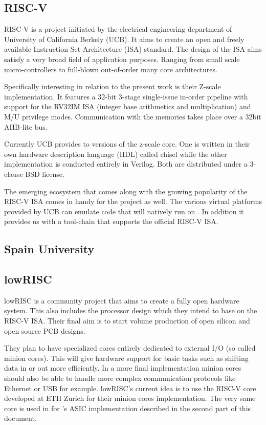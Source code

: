 \subsection{RISC-V}

RISC-V is a project initiated by the electrical engineering department of University of California Berkely (UCB). It aims to create an open and freely available Instruction Set Architecture (ISA) standard. The design of the ISA aims satisfy a very broad field of application purposes. Ranging from small scale micro-controllers to full-blown out-of-order many core architectures.

Specifically interesting in relation to the present work is their Z-scale implementation. It features a 32-bit 3-stage single-issue in-order pipeline with support for the RV32IM ISA (integer base arithmetics and multiplication) and M/U privilege modes. Communication with the memories takes place over a 32bit AHB-lite bus.

Currently UCB provides to versions of the z-scale core. One is written in their own hardware description language (HDL) called chisel while the other implementation is conducted entirely in Verilog. Both are distributed under a 3-clause BSD license.

The emerging ecosystem that comes along with the growing popularity of the RISC-V ISA comes in handy for the \pulpino project as well. The various virtual platforms provided by UCB can emulate code that will natively run on \pulpino. In addition it provides us with a tool-chain that supports the official RISC-V ISA.

\subsection{Spain University}

\subsection{lowRISC}

lowRISC is a community project that aims to create a fully open hardware system. This also includes the processor design which they intend to base on the RISC-V ISA. Their final aim is to start volume production of open silicon and open source PCB designs.

They plan to have specialized cores entirely dedicated to external I/O (so called minion cores). This will give hardware support for basic tasks such as shifting data in or out more efficiently. In a more final implementation minion cores should also be able to handle more complex communication protocols like Ethernet or USB for example. lowRISC's current idea is to use the RISC-V core developed at ETH Zurich for their minion cores implementation. The very same core is used in for \pulpino's ASIC implementation described in the second part of this document.



